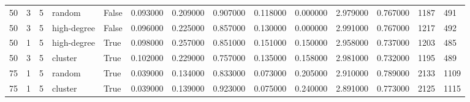 \begin{table}
\begin{tabular}{llllllllllllll}
50 & 3 & 5 & random & False & 0.093000 & 0.209000 & 0.907000 & 0.118000 & 0.000000 & 2.979000 & 0.767000 & 1187 & 491 \\
50 & 3 & 5 & high-degree & False & 0.096000 & 0.225000 & 0.857000 & 0.130000 & 0.000000 & 2.991000 & 0.767000 & 1217 & 492 \\
50 & 1 & 5 & high-degree & True & 0.098000 & 0.257000 & 0.851000 & 0.151000 & 0.150000 & 2.958000 & 0.737000 & 1203 & 485 \\
50 & 3 & 5 & cluster & True & 0.102000 & 0.229000 & 0.757000 & 0.135000 & 0.158000 & 2.981000 & 0.732000 & 1195 & 489 \\
75 & 1 & 5 & random & True & 0.039000 & 0.134000 & 0.833000 & 0.073000 & 0.205000 & 2.910000 & 0.789000 & 2133 & 1109 \\
75 & 1 & 5 & cluster & True & 0.039000 & 0.139000 & 0.923000 & 0.075000 & 0.240000 & 2.891000 & 0.773000 & 2125 & 1115 \\
\bottomrule
\end{tabular}
\end{table}
